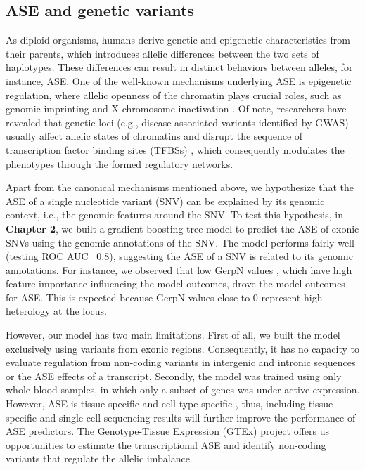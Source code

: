 \documentclass{book}
\begin{document}
\begin{refsection}
\subsection*{ASE and genetic variants}
As diploid organisms, humans derive genetic and epigenetic characteristics from their parents, which introduces allelic differences between the two sets of haplotypes.
These differences can result in distinct behaviors between alleles, for instance, ASE.
One of the well-known mechanisms underlying ASE is epigenetic regulation, where allelic openness of the chromatin plays crucial roles, such as genomic imprinting \cite{Monk2019Genomic} and X-chromosome inactivation \cite{Galupa2018X}.
Of note, researchers have revealed that genetic loci (e.g., disease-associated variants identified by GWAS) usually affect allelic states of chromatins \cite{Zhang2020Allele,Hoffman2019Functional,Skelly2020Mapping} and disrupt the sequence of transcription factor binding sites (TFBSs) \cite{Deplancke2016The}, which consequently modulates the phenotypes through the formed regulatory networks.

Apart from the canonical mechanisms mentioned above, we hypothesize that the ASE of a single nucleotide variant (SNV) can be explained by its genomic context, i.e., the genomic features around the SNV.
To test this hypothesis, in \textbf{Chapter 2}, we built a gradient boosting tree model to predict the ASE of exonic SNVs using the genomic annotations of the SNV.
The model performs fairly well (testing ROC AUC ~0.8), suggesting the ASE of a SNV is related to its genomic annotations.
For instance, we observed that low GerpN values \cite{Davydov2010Identifying}, which have high feature importance influencing the model outcomes, drove the model outcomes for ASE.
This is expected because GerpN values close to 0 represent high heterology at the locus.

However, our model has two main limitations.
First of all, we built the model exclusively using variants from exonic regions.
Consequently, it has no capacity to evaluate regulation from non-coding variants in intergenic and intronic sequences or the ASE effects of a transcript.
Secondly, the model was trained using only whole blood samples, in which only a subset of genes was under active expression.
However, ASE is tissue-specific and cell-type-specific \cite{Castel2020A}, thus, including tissue-specific and single-cell sequencing results will further improve the performance of ASE predictors.
The Genotype-Tissue Expression (GTEx) project \cite{Lonsdale2013The} offers us opportunities to estimate the transcriptional ASE and identify non-coding variants that regulate the allelic imbalance.


\end{refsection}
\end{document}
